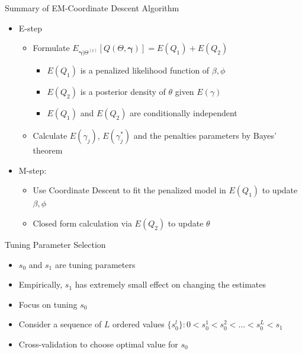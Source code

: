 \documentclass[
  ignorenonframetext,
  aspectratio=169]{beamer}
\providecommand{\tightlist}{%
  \setlength{\itemsep}{0pt}\setlength{\parskip}{0pt}}
\newcommand{\tp}{*}
\begin{document}
\begin{frame}{Summary of EM-Coordinate Descent Algorithm}
\protect\hypertarget{summary-of-em-coordinate-descent-algorithm}{}
\begin{itemize}
\tightlist
\item
  E-step

  \begin{itemize}
  \tightlist
  \item
    Formulate
    \(E_{\bm \gamma|\Theta^{(t)}}\left[Q(\Theta, \bm \gamma)\right] = E(Q_1) + E(Q_2)\)

    \begin{itemize}
    \tightlist
    \item
      \(E(Q_1)\) is a penalized likelihood function of \(\beta, \phi\)
    \item
      \(E(Q_2)\) is a posterior density of \(\theta\) given
      \(E(\gamma)\)
    \item
      \(E(Q_1)\) and \(E(Q_2)\) are conditionally independent
    \end{itemize}
  \item
    Calculate \(E(\gamma_{j})\), \(E(\gamma^\tp_{j})\) and the penalties
    parameters by Bayes' theorem
  \end{itemize}
\item
  M-step:

  \begin{itemize}
  \tightlist
  \item
    Use Coordinate Descent to fit the penalized model in \(E(Q_1)\) to
    update \(\beta, \phi\)
  \item
    Closed form calculation via \(E(Q_2)\) to update \(\theta\)
  \end{itemize}
\end{itemize}
\end{frame}

\begin{frame}{Tuning Parameter Selection}
\protect\hypertarget{tuning-parameter-selection}{}
\begin{itemize}
\tightlist
\item
  \(s_0\) and \(s_1\) are tuning parameters
\item
  Empirically, \(s_1\) has extremely small effect on changing the
  estimates
\item
  Focus on tuning \(s_0\)
\item
  Consider a sequence of \(L\) ordered values
  \(\{s_0^l\}: 0 < s_0^1 < s_0^2 < \dots < s_0^L < s_1\)
\item
  Cross-validation to choose optimal value for \(s_0\)
\end{itemize}
\end{frame}
\end{document}
